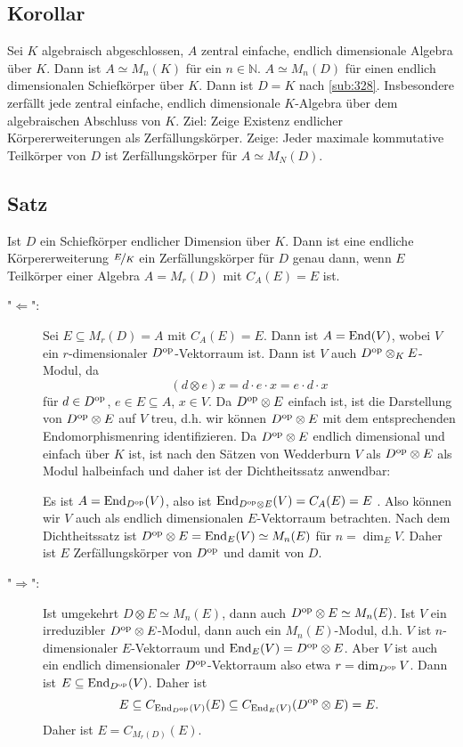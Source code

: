 \subsection{Korollar} %
\label{sub:329}
Sei $K$ algebraisch abgeschlossen, $A$ zentral einfache, endlich dimensionale Algebra über $K$. Dann ist $A \simeq M_n(K)$ für ein $n \in \mathds{N}$.
$A \simeq M_n(D)$ für einen endlich dimensionalen Schiefkörper über $K$. Dann ist $D=K$ nach \ref{sub:328}. \bewende
{}
Insbesondere zerfällt jede zentral einfache, endlich dimensionale $K$-Algebra über dem algebraischen Abschluss von $K$. Ziel: Zeige Existenz endlicher Körpererweiterungen
als Zerfällungskörper. Zeige: Jeder maximale kommutative Teilkörper von $D$ ist Zerfällungskörper für $A \simeq M_N(D)$.

\subsection{Satz} %
\label{sub:330}
Ist $D$ ein Schiefkörper endlicher Dimension über $K$. Dann ist eine endliche Körpererweiterung $\nicefrac{E}{K}$ ein Zerfällungskörper für $D$ genau dann, wenn $E$ 
Teilkörper einer Algebra $A= M_r(D)$ mit $C_A(E)=E$ ist.
\begin{description}
	\item["$\Leftarrow$":] Sei $E \subseteq M_r(D) = A$ mit $C_A(E)=E$. Dann ist $A = \operatorname{End}(V)$, wobei $V$ ein $r$-dimensionaler $D^{\mathrm{op}}$-Vektorraum ist. Dann ist
	$V$ auch $D^{\mathrm{op}} \otimes _K E$-Modul, da 
	\[
		(d \otimes e)x = d \cdot e \cdot x = e \cdot d \cdot x 
	\]
	für $d \in D^{\mathrm{op}}$, $ e \in E \subseteq A$, $x \in V$. Da $D^{\mathrm{op}} \otimes E$ einfach ist, ist die Darstellung von $D^{\mathrm{op}} \otimes E$ auf $V$ treu,
	 d.h. wir können $D^{\mathrm{op}} \otimes E$ mit dem entsprechenden Endomorphismenring identifizieren. Da 
	$D^{\mathrm{op}} \otimes E$ endlich dimensional und einfach über $K$ ist, ist nach den Sätzen von Wedderburn $V$ als $D^{\mathrm{op}} \otimes E$ als Modul halbeinfach und
	daher ist der Dichtheitssatz anwendbar:
	
	Es ist $A = \operatorname{End}_{D^{\mathrm{op}}}(V)$, also ist $\operatorname{End}_{D^{\mathrm{op}} \otimes E} (V) = C_A(E) = E$ . 
	Also können wir $V$ auch als endlich dimensionalen $E$-Vektorraum 
	betrachten. Nach dem Dichtheitssatz ist $D^{\mathrm{op}} \otimes E = \operatorname{End}_E(V) \simeq M_n(E)$ für $n = \dim_E V$. Daher ist $E$ Zerfällungskörper von $D^{\mathrm{op}}$ und
	damit von $D$.
	\item["$\Rightarrow$":] Ist umgekehrt $D \otimes E \simeq M_n(E)$, dann auch $D^{\mathrm{op}} \otimes E \simeq M_n(E)$. Ist $V$ ein irreduzibler 
	$D^{\mathrm{op}} \otimes E$-Modul, dann auch ein $M_n(E)$-Modul, d.h. $V$ ist $n$-dimensionaler $E$-Vektorraum und $\operatorname{End}_E(V) = D^{\mathrm{op}} \otimes E$. Aber $V$ ist 
	auch ein endlich dimensionaler $D^{\mathrm{op}}$-Vektorraum also etwa $r = \dim_{D^{\mathrm{op}}}V$. Dann ist $E \subseteq \operatorname{End}_{D^{\mathrm{op}}}(V)$. Daher ist 
	\[
		E \subseteq C_{\End_{D^\op}(V)}(E) \subseteq C_{\End_E(V)} \enbrace*{D^\op \otimes E} = E.
	\]
	Daher ist $E=C_{M_r(D)}(E)$. \bewende
\end{description}

